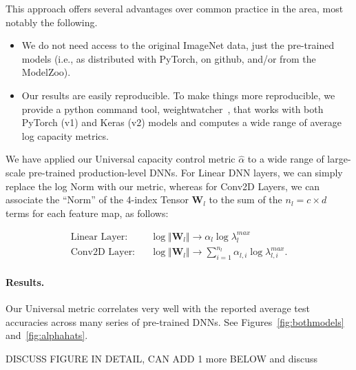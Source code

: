 This approach offers several advantages over common practice in the area, most notably the following.
\begin{itemize}
\item 
We do not need access to the original ImageNet data, just the pre-trained models (i.e., as distributed with PyTorch, on github, and/or from the ModelZoo).
\item 
Our results are easily reproducible.
To make things more reproducible, we provide a python command tool, weightwatcher~\cite{weightwatcher_package_justURL}, that works with both PyTorch (v1) and Keras (v2) models and computes a wide range of average log capacity metrics.
\end{itemize}
 
We have applied our Universal capacity control metric $\hat{\alpha}$ to a wide range of large-scale pre-trained production-level DNNs.
For Linear DNN layers, we can simply replace the log Norm with our metric, whereas for Conv2D Layers, we can associate the ``Norm'' of the 4-index Tensor $\mathbf{W}_{l}$ to the sum of the $n_{l}=c\times d$ terms for each feature map, as follows:

\begin{eqnarray*}
\text{Linear Layer:} & & \log\Vert\mathbf{W}_{l}\Vert
\rightarrow 
\alpha_{l}\log\lambda_{l}^{max}  \\
\text{Conv2D Layer:} & & \log\Vert\mathbf{W}_{l}\Vert
\rightarrow 
\sum_{i=1}^{n_{l}}\alpha_{l,i} \log\lambda_{l,i}^{max} .
\end{eqnarray*}

\paragraph{Results.} 
Our Universal metric correlates very well with the reported average test accuracies across many series of pre-trained DNNs.
See Figures~\ref{fig:bothmodels} and~\ref{fig:alphahats}.

DISCUSS FIGURE IN DETAIL, CAN ADD 1 more BELOW and discuss

